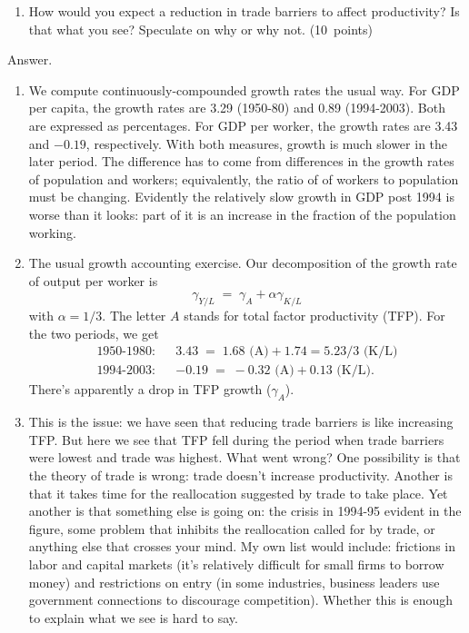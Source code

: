 \documentclass[letterpaper,12pt]{article}
\begin{document}
\begin{enumerate}
\begin{enumerate}
\item How would you expect a reduction in trade barriers  
to affect productivity?
Is that what you see?  
Speculate on why or why not.   
(10~points)
\end{enumerate}


Answer.
\begin{enumerate}

\item We compute continuously-compounded growth rates the usual way.
For GDP per capita, the growth rates 
are 3.29 (1950-80) and 0.89 (1994-2003).  
Both are expressed as percentages.
For GDP per worker, the growth rates are 3.43 and $-0.19$, respectively.  
With both measures, growth is much slower in the later period.  
The difference has to come from differences in the growth rates 
of population and workers; equivalently, the ratio of 
of workers to population must be changing.  
Evidently the relatively slow growth in GDP post 1994
is worse than it looks:  part of it is an increase 
in the fraction of the population working.  


\item The usual growth accounting exercise.  
Our decomposition of the growth rate of output per worker is 
\[
        \gamma_{Y/L} \;=\; \gamma_A + \alpha \gamma_{K/L}  
\]
with $\alpha = 1/3$.
The letter $A$ stands for total factor productivity (TFP).    
For the two periods, we get 
\begin{eqnarray*}
    \mbox{1950-1980:} &&  3.43  \;=\; 1.68 \mbox{ (A)} 
                +  1.74 = 5.23/3 \mbox{ (K/L)}   \\
    \mbox{1994-2003:} &&  -0.19 \;=\; -0.32 \mbox{ (A)} 
                +  0.13 \mbox{ (K/L)} .
\end{eqnarray*}
There's apparently a drop in TFP growth ($\gamma_A$).  


\item This is the issue:  we have seen that reducing trade barriers
is like increasing TFP.  
But here we see that TFP fell during the period when trade 
barriers were lowest and trade was highest.  
What went wrong?  
One possibility is that the theory of trade is wrong:  
trade doesn't increase productivity.
Another is that it takes time for the reallocation 
suggested by trade to take place.  
Yet another is that something else is going on:  
the crisis in 1994-95 evident in the figure, 
some problem that inhibits the reallocation 
called for by trade, 
or anything else that crosses your mind.  
My own list would include:
frictions in labor and capital markets (it's relatively 
difficult for small firms to borrow money)
and restrictions on entry (in some industries, 
business leaders use government connections 
to discourage competition). 
Whether this is enough to explain what we see is hard to say.  


\end{enumerate}
\end{enumerate}
\end{document}
